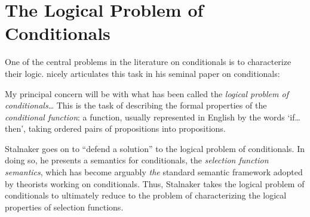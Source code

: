 \documentclass[12pt]{article}
\begin{document}
\section{The Logical Problem of Conditionals}
\label{Section:The Logical Problem of Conditionals}

One of the central problems in the literature on conditionals is to characterize their logic. 
\cite{Stalnaker1968theory} nicely articulates this task in his seminal paper on conditionals:
\begin{displayquote}
    My principal concern will be with what has been called the \emph{logical problem of conditionals}\dots 
    This is the task of describing the formal properties of the \emph{conditional function}: a function, usually represented in English by the words `if\dots then', taking ordered pairs of propositions into propositions.
\end{displayquote}
Stalnaker goes on to ``defend a solution'' to the logical problem of conditionals. 
In doing so, he presents a semantics for conditionals, the \emph{selection function semantics}, which has become arguably \emph{the} standard semantic framework adopted by theorists working on conditionals. 
Thus, Stalnaker takes the logical problem of conditionals to ultimately reduce to the problem of characterizing the logical properties of selection functions. 
\end{document}
